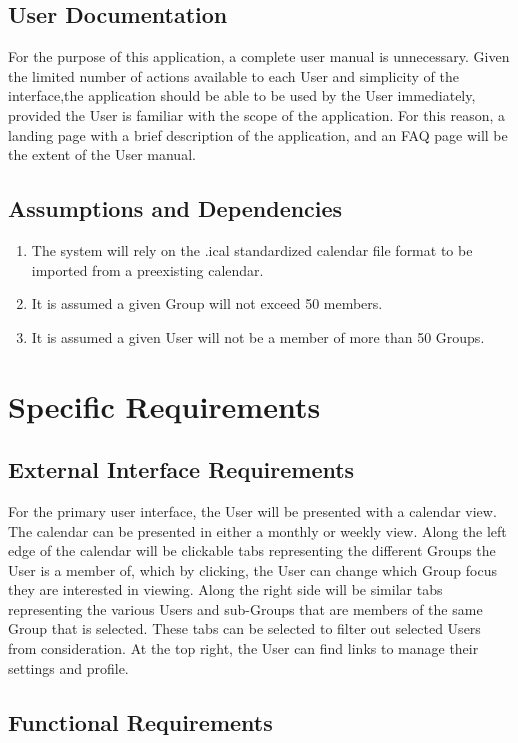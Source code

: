 \documentclass{scrreprt}
\begin{document}
\section{User Documentation}
For the purpose of this application, a complete user manual is unnecessary.
Given the limited number of actions available to each User and simplicity of the
interface,the application should be able to be used by the User immediately,
provided the User is familiar with the scope of the application. For this
reason, a landing page with a brief description of the application, and an FAQ
page will be the extent of the User manual.

\section{Assumptions and Dependencies}
\begin{enumerate}
\item The system will rely on the .ical standardized calendar file format to
be imported from a preexisting calendar.
\item It is assumed a given Group will not exceed 50 members.
\item It is assumed a given User will not be a member of more than 50 Groups.
\end{enumerate}


\chapter{Specific Requirements}

\section{External Interface Requirements}
For the primary user interface, the User will be presented with a calendar view.
The calendar can be presented in either a monthly or weekly view. Along the left
edge of the calendar will be clickable tabs representing the different Groups
the User is a member of, which by clicking, the User can change which Group
focus they are interested in viewing. Along the right side will be similar tabs
representing the various Users and sub-Groups that are members of the same
Group that is selected. These tabs can be selected to filter out selected Users
from consideration. At the top right, the User can find links to manage their
settings and profile.
\section{Functional Requirements}
\end{document}

